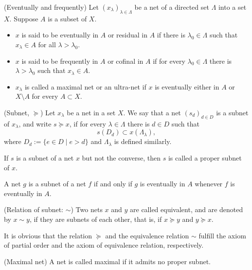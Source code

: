 \documentclass{article}
\begin{document}
\begin{dfn} (Eventually and frequently)
    Let \( (x_{\lambda})_{\lambda \in \Lambda} \) be a net of a directed set \( \Lambda \) into a set \( X \). Suppose \( A \) is a subset of \( X \).
    \begin{itemize}
        \item \( x \) is said to be eventually in \( A \) or residual in \( A \) if there is \( \lambda_0 \in \Lambda \) such that \( x_{\lambda} \in A\) for all \( \lambda >\lambda_0 \).
        \item \( x \) is said to be frequently in \( A \) or cofinal in \( A \) if for every \( \lambda_0 \in \Lambda \) there is \( \lambda > \lambda_0\) such that \( x_{\lambda} \in A\).
        \item \( x_{\lambda} \) is called a maximal net or an ultra-net if \( x \) is eventually either in \( A \) or \( X \setminus A \) for every \( A \subset X \).
    \end{itemize}
\end{dfn}


\begin{dfn} (Subnet, \( \succeq \))
    Let \( x_{\lambda} \) be a net in a set \( X \). We say that a net \( \left( s_d \right)_{d \in D} \) is a subnet of \( x_{\lambda} \), and write \( s \succeq x \), if for every \( \lambda \in \Lambda \) there is \( d \in D \) such that
    \begin{equation*}
        s(D_d) \subset x(\Lambda_{\lambda}),
    \end{equation*}
    where \( D_d:=\{ e \in D \mid e >d \} \) and \( \Lambda_{\lambda} \) is defined similarly.

    If \( s \) is a subnet of a net \( x \) but not the converse, then \( s \) is called a proper subnet of \( x \).
\end{dfn}

\begin{lem}\label{characterize subnet}
    A net \( g \) is a subnet of a net \( f \) if and only if \( g \) is eventually in \( A \) whenever \( f \) is eventually in \( A \).
\end{lem}

\begin{dfn} (Relation of subnet: \( \sim \))
    Two nets \( x \) and \( y \) are called equivalent, and are denoted by \( x \sim y \), if they are subnets of each other, that is, if \( x \succeq y \) and \( y \succeq x \).
\end{dfn}

\begin{rem}
    It is obvious that the relation \( \succeq \) and the equivalence relation \( \sim \) fulfill the axiom of partial order and the axiom of equivalence relation, respectively.
\end{rem}

\begin{dfn} (Maximal net)
    A net is called maximal if it admits no proper subnet.
\end{dfn}
\end{document}
